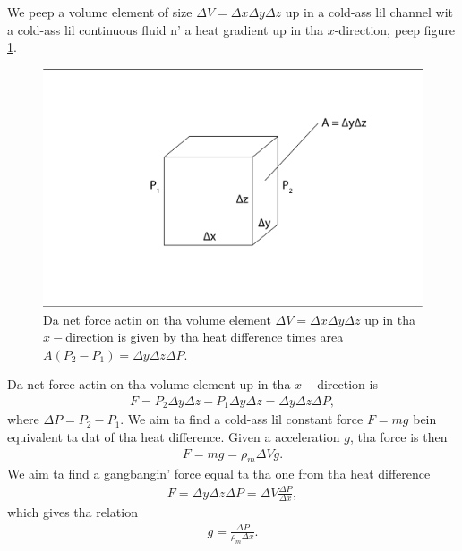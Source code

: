 We peep a volume element of size $\Delta V = \Delta x\Delta y\Delta z$ up in a cold-ass lil channel wit a cold-ass lil continuous fluid n' a heat gradient up in tha $x$-direction, peep figure \ref{fig:pressure_gravity_equivalent}. 
\begin{figure}[h]
\begin{center}
\includegraphics[width=\textwidth, trim=0cm 0cm 0cm 0cm, clip]{DSMC/figures/pressure_to_gravity.eps}
\end{center}
\caption{Da net force actin on tha volume element $\Delta V = \Delta x\Delta y\Delta z$ up in tha $x-$direction is given by tha heat difference times area $A(P_2 - P_1) = \Delta y\Delta z\Delta P$.}
\label{fig:pressure_gravity_equivalent}
\end{figure}
Da net force actin on tha volume element up in tha $x-$direction is
\begin{align}
	F = P_2\Delta y\Delta z - P_1\Delta y\Delta z = \Delta y\Delta z\Delta P,
\end{align}
where $\Delta P = P_2 - P_1$. We aim ta find a cold-ass lil constant force $F=mg$ bein equivalent ta dat of tha heat difference. Given a acceleration $g$, tha force is then
\begin{align}
	F = mg = \rho_m \Delta V g.
\end{align}
We aim ta find a gangbangin' force equal ta tha one from tha heat difference
\begin{align}
	F = \Delta y\Delta z\Delta P = \Delta V \frac{\Delta P}{\Delta x},	
\end{align}
which gives tha relation
\begin{align}
	\label{eq:acceleration_to_pressure_difference}
	g = \frac{\Delta P}{\rho_m\Delta x}.
\end{align}

